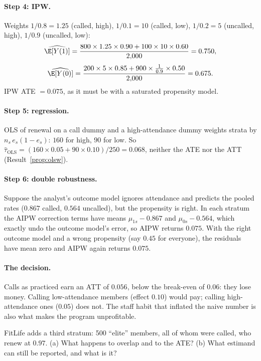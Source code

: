 \documentclass[11pt]{article}
\begin{document}
\paragraph{Step 4: IPW.} Weights $1/0.8 = 1.25$ (called, high), $1/0.1 = 10$ (called, low), $1/0.2 = 5$ (uncalled, high), $1/0.9$ (uncalled,
low):
\[
  \widehat{\E[Y(1)]} = \frac{800 \times 1.25 \times 0.90 + 100 \times 10 \times 0.60}{2{,}000} = 0.750,
\]
\[
  \widehat{\E[Y(0)]} = \frac{200 \times 5 \times 0.85 + 900 \times \tfrac{1}{0.9} \times 0.50}{2{,}000} = 0.675 .
\]
IPW ATE $= 0.075$, as it must be with a saturated propensity model.

\paragraph{Step 5: regression.} OLS of renewal on a call dummy and a high-attendance dummy weights strata by
$n_s\,e_s(1-e_s)$: $160$ for high, $90$ for low. So $\hat\tau_{\text{OLS}} = (160 \times 0.05 + 90 \times 0.10)/250 = 0.068$, neither the ATE nor
the ATT (Result~\ref{prop:olsw}).

\paragraph{Step 6: double robustness.} Suppose the analyst's outcome model ignores attendance and predicts the pooled rates
($0.867$ called, $0.564$ uncalled), but the propensity is right. In each stratum the AIPW correction terms have means
$\mu_{1s} - 0.867$ and $\mu_{0s} - 0.564$, which exactly undo the outcome model's error, so AIPW returns $0.075$. With the right outcome
model and a wrong propensity (say $0.45$ for everyone), the residuals have mean zero and AIPW again returns $0.075$.

\paragraph{The decision.} Calls as practiced earn an ATT of $0.056$, below the break-even of $0.06$: they lose money. Calling
low-attendance members (effect $0.10$) would pay; calling high-attendance ones ($0.05$) does not. The staff habit that inflated the
naive number is also what makes the program unprofitable.

\begin{exercise}[computation]
FitLife adds a third stratum: 500 ``elite'' members, all of whom were called, who renew at $0.97$. (a) What happens to overlap and to
the ATE? (b) What estimand can still be reported, and what is it?
\end{exercise}
\end{document}
